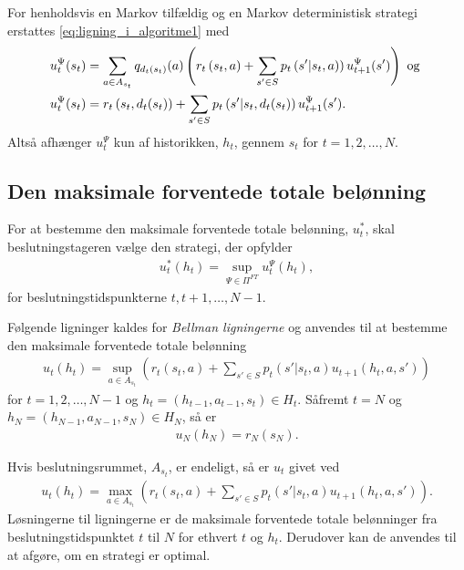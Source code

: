 For henholdsvis en Markov tilfældig og en Markov deterministisk strategi erstattes \eqref{eq:ligning_i_algoritme1} med 
\begin{align*}
        \vspace{-0.5cm}u_t^\Psi(s_t) &=\sum_{a \in A_{s_t}}q_{d_t(s_t)}(a)\left( r_t\left(s_t, a\right) + \sum_{s' \in S} p_t\left(s'|s_t,a)\right)u_{t+1}^\Psi(s')\right) \text{ og }\\
        \vspace{-0.5cm}u_t^\Psi(s_t) &= r_t\left(s_t, d_t(s_t)\right) + \sum_{s' \in S} p_t\left(s'|s_t,d_t(s_t)\right)u_{t+1}^\Psi(s').
\end{align*}
Altså afhænger $u_t^\Psi$ kun af historikken, $h_t$, gennem $s_t$ for $t = 1, 2, \ldots, N$.

\subsection{Den maksimale forventede totale belønning}
For at bestemme den maksimale forventede totale belønning, $u_t^*$, skal beslutningstageren vælge den strategi, der opfylder
\begin{align}\label{eq:u*}
    u_t^*(h_t)=\sup_{\Psi\in\Pi^{FT}}u_t^\Psi(h_t),
\end{align}
for beslutningstidspunkterne $t, t+1,\ldots, N-1$. 

Følgende ligninger kaldes for \textit{Bellman ligningerne} og anvendes til at bestemme den maksimale forventede totale belønning
\begin{align}\label{eq:u_t_sup}
   u_t(h_t)=\sup_{a\in A_{s_t}}\left(r_t(s_t, a)+\sum_{s'\in S}p_t(s'|s_t, a)u_{t+1}(h_t, a, s')\right)
\end{align}
for $t=1, 2, \ldots, N-1$ og $h_t=(h_{t-1}, a_{t-1}, s_t)\in H_t$.
Såfremt $t= N$ og $h_N = (h_{N-1}, a_{N-1}, s_N) \in H_N$, så er 
\begin{align}\label{eq:u_N}
    u_N(h_N) = r_N(s_N). 
\end{align}

Hvis beslutningsrummet, $A_{s_t}$, er endeligt, så er $u_t$ givet ved
\begin{align}\label{eq:u_t_max}
   u_t(h_t)=\max_{a\in A_{s_t}}\left(r_t(s_t, a)+\sum_{s'\in S}p_t(s'|s_t, a)u_{t+1}(h_t, a, s')\right).
\end{align}
Løsningerne til ligningerne er de maksimale forventede totale belønninger fra beslutningstidspunktet $t$ til $N$ for ethvert $t$ og $h_t$. Derudover kan de anvendes til at afgøre, om en strategi er optimal. 


